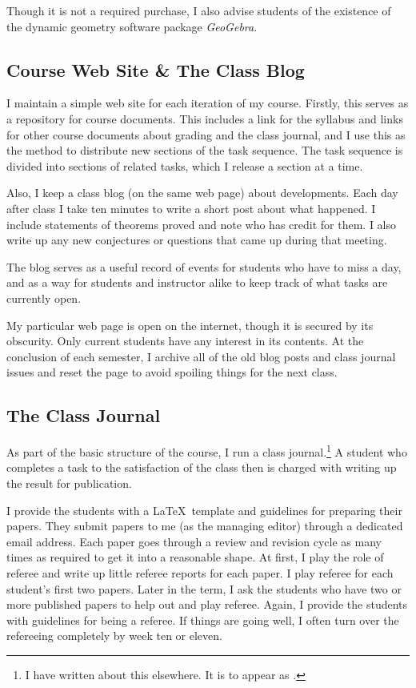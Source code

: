 \documentclass{tufte-handout}
\theoremstyle{definition}
\begin{document}
Though it is not a required purchase, I also advise students of the existence of the dynamic geometry software package \emph{GeoGebra}.\cite{GGB}


\subsection{Course Web Site \& The Class Blog}

I maintain a simple web site for each iteration of my course. Firstly, this serves as a repository for course documents. This includes a link for the syllabus and links for other course documents about grading and the class journal, and I use this as the method to distribute new sections of the task sequence. The task sequence is divided into sections of related tasks, which I release a section at a time.

Also, I keep a class blog (on the same web page) about developments. Each day after class I take ten minutes to write a short post about what happened. I include statements of theorems proved and note who has credit for them. I also write up any new conjectures or questions that came up during that meeting.

The blog serves as a useful record of events for students who have to miss a day, and as a way for students and instructor alike to keep track of what tasks are currently open.

My particular web page is open on the internet, though it is secured by its obscurity. Only current students have any interest in its contents. At the conclusion of each semester, I archive all of the old blog posts and class journal issues and reset the page to avoid spoiling things for the next class.


\subsection{The Class Journal}

As part of the basic structure of the course, I run a class journal.\footnote{I have written about this elsewhere. It is to appear as \cite{MAANOTES}.}
A student who completes a task to the satisfaction of the class then is charged with writing up the result for publication. 

I provide the students with a \LaTeX\ template and guidelines for preparing their papers. They submit papers to me (as the managing editor) through a dedicated email address. Each paper goes through a review and revision cycle as many times as required to get it into a reasonable shape. At first, I play the role of referee and write up little referee reports for each paper. I play referee for each student's first two papers. Later in the term, I ask the students who have two or more published papers to help out and play referee. Again, I provide the students with guidelines for being a referee. If things are going well, I often turn over the refereeing completely by week ten or eleven. 
\end{document}
